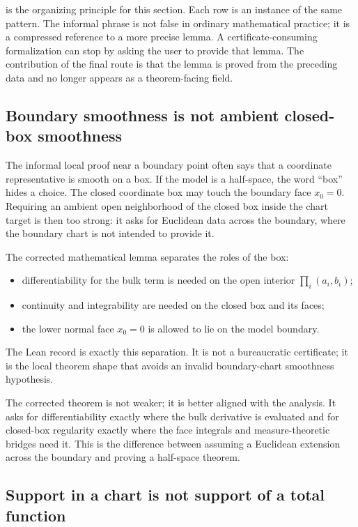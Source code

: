  is the organizing principle for this section.  Each
row is an instance of the same pattern.  The informal phrase is not false in
ordinary mathematical practice; it is a compressed reference to a more precise
lemma.  A certificate-consuming formalization can stop by asking the user to
provide that lemma.  The contribution of the final route is that the lemma is
proved from the preceding data and no longer appears as a theorem-facing
field.

\subsection{Boundary smoothness is not ambient closed-box smoothness}

The informal local proof near a boundary point often says that a coordinate
representative is smooth on a box.  If the model is a half-space, the word
``box'' hides a choice.  The closed coordinate box may touch the boundary
face \(x_0=0\).  Requiring an ambient open neighborhood of the closed box
inside the chart target is then too strong: it asks for Euclidean data across
the boundary, where the boundary chart is not intended to provide it.

The corrected mathematical lemma separates the roles of the box:
\begin{itemize}
  \item differentiability for the bulk term is needed on the open interior
  \(\prod_i(a_i,b_i)\);
  \item continuity and integrability are needed on the closed box and its
  faces;
  \item the lower normal face \(x_0=0\) is allowed to lie on the model
  boundary.
\end{itemize}
The Lean record  is exactly this
separation.  It is not a bureaucratic certificate; it is the local theorem
shape that avoids an invalid boundary-chart smoothness hypothesis.

The corrected theorem is not weaker; it is better aligned with the analysis.
It asks for differentiability exactly where the bulk derivative is evaluated
and for closed-box regularity exactly where the face integrals and
measure-theoretic bridges need it.  This is the difference between assuming a
Euclidean extension across the boundary and proving a half-space theorem.

\subsection{Support in a chart is not support of a total function}

